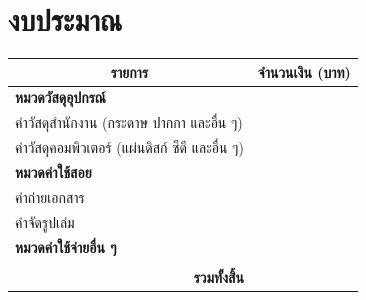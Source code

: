 \section{งบประมาณ}

\begin{table}[H]
    \centering
    \begin{tabular}{|p{9cm}|r|}
        \hline
        \multicolumn{1}{|c|}{รายการ} & \multicolumn{1}{c|}{จำนวนเงิน (บาท)} \\
        \hline
        \textbf{หมวดวัสดุอุปกรณ์} & \\
        \hspace{1em}ค่าวัสดุสำนักงาน (กระดาษ ปากกา และอื่น ๆ) & \\
        \hspace{1em}ค่าวัสดุคอมพิวเตอร์ (แผ่นดิสก์ ซีดี และอื่น ๆ) & \\
        \hline
        \textbf{หมวดค่าใช้สอย} & \\
        \hspace{1em}ค่าถ่ายเอกสาร & \\
        \hspace{1em}ค่าจัดรูปเล่ม & \\
        \hline
        \textbf{หมวดค่าใช้จ่ายอื่น ๆ} & \\
        \hspace{1em} & \\
        \hline
        \multicolumn{1}{|r|}{\textbf{รวมทั้งสิ้น}} & \\
        \hline
    \end{tabular}
\end{table}
